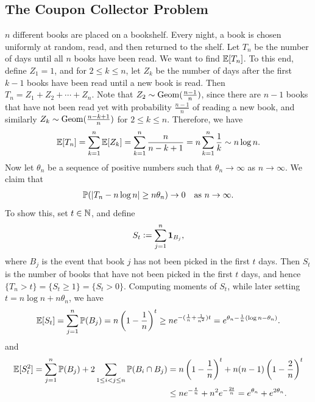 \subsection{The Coupon Collector Problem}
$n$ different books are placed on a bookshelf. Every night, a book is chosen uniformly at random, read, and then returned to the shelf. Let $T_{n}$ be the number of days until all $n$ books have been read. We want to find $\mathbb{E}[T_{n}]$. To this end, define $Z_{1} = 1$, and for $2 \leq k \leq n$, let $Z_{k}$ be the number of days after the first $k-1$ books have been read until a new book is read. Then $T_{n} = Z_{1} + Z_{2} + \cdots + Z_{n}$. Note that $Z_{2} \sim \operatorname{Geom}(\frac{n-1}{n})$, since there are $n-1$ books that have not been read yet with probability $\frac{n-1}{n}$ of reading a new book, and similarly $Z_{k} \sim \operatorname{Geom}(\frac{n-k+1}{n})$ for $2 \leq k \leq n$. Therefore, we have
\begin{align}
    \mathbb{E}[T_{n}] = \sum_{k=1}^{n} \mathbb{E}[Z_{k}] = \sum_{k=1}^{n} \frac{n}{n-k+1} = n\sum_{k=1}^{n} \frac{1}{k} \sim n\log n.
\end{align}
Now let $\theta_{n}$ be a sequence of positive numbers such that $\theta_{n} \to \infty$ as $n \to \infty$. We claim that
\begin{align}
    \mathbb{P}(\left| T_{n}-n \log n \right| \geq n \theta_{n}) \to 0 \quad \text{as } n \to \infty.
\end{align}
To show this, set $t \in \mathbb{N}$, and define
\begin{align}
    S_{t} \vcentcolon= \sum_{j=1}^{n} \textbf{1}_{B_{j}},
\end{align}
where $B_{j}$ is the event that book $j$ has not been picked in the first $t$ days. Then $S_{t}$ is the number of books that have not been picked in the first $t$ days, and hence $\{T_{n} > t\} = \{S_{t} \geq 1\} = \{S_{t} > 0\}$. Computing moments of $S_{t}$, while later setting $t = n \log n + n \theta_{n}$, we have
\begin{align}
    \mathbb{E}[S_{t}] = \sum_{j=1}^{n} \mathbb{P}(B_{j}) = n\left(1-\frac{1}{n}\right)^{t} \geq ne^{-(\frac{1}{n}+\frac{1}{n^{2}})t} = e^{\theta_{n} - \frac{1}{n}(\log n -\theta_{n})}.
\end{align}
and
\begin{align}
    \mathbb{E}[S_{t}^{2}] = \sum_{j=1}^{n} \mathbb{P}(B_{j}) + 2\sum_{1 \leq i < j \leq n} \mathbb{P}(B_{i} \cap B_{j}) &= n\left(1-\frac{1}{n}\right)^{t} + n(n-1)\left(1-\frac{2}{n}\right)^{t} \notag \\
    &\leq ne^{-\frac{t}{n}} + n^{2}e^{-\frac{2t}{n}} = e^{\theta_{n}}+e^{2\theta_{n}}.
\end{align}
